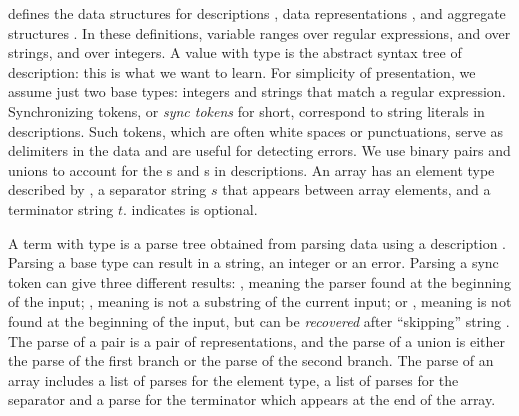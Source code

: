 
 defines
the data structures for descriptions , data
representations , and aggregate structures .
In these definitions,  variable  ranges over regular expressions,
 and  over strings, and  over integers.
A value with type  is the abstract syntax tree of \pads{}
description: this is what we want to learn.  
For simplicity of presentation, we assume just two base types: 
integers and strings that match a regular expression. Synchronizing
tokens, or {\em sync tokens} for short, correspond to string literals
in \pads{} descriptions.  Such tokens, which are often
white spaces or punctuations,
serve as delimiters in the data and are useful for detecting
errors. We use binary pairs and unions to account for the
s and s in \padsc{} descriptions.
An array has an element type described by , a separator
string $s$ that appears between array elements, and a
terminator string $t$.  indicates  is optional.

A term with type  is a parse tree obtained from parsing 
data using a description .  Parsing a base type can result in a
string, an integer or an error.  Parsing a sync token
 can give three different results: , meaning the
parser found  at the beginning of the input; , meaning
 is not a substring of the current input; or ,
meaning  is not found at the beginning of the input, but
can be {\em recovered} after ``skipping'' string .  The parse
of a pair is a pair of representations, and the parse of a union is
either the parse of the first branch or the parse of the second
branch. The parse of an array includes a list of parses for the
element type, a list of parses for the separator and a parse for the
terminator which appears at the end of the array.

